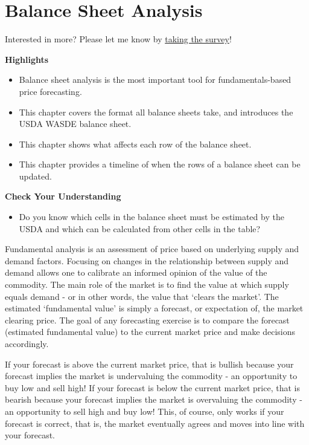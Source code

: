 \documentclass[
  letterpaper,
  DIV=11,
  numbers=noendperiod]{scrreprt}
\providecommand{\tightlist}{%
  \setlength{\itemsep}{0pt}\setlength{\parskip}{0pt}}\usepackage{longtable,booktabs,array}
\begin{document}
\chapter{Balance Sheet Analysis}\label{balance-sheet-analysis}

{Interested in more? Please let me know by}
\href{https://forms.gle/Q3VByCQZHjfQSy9D7}{taking the survey}!

\textbf{Highlights}

\begin{itemize}
\tightlist
\item
  Balance sheet analysis is the most important tool for
  fundamentals-based price forecasting.
\item
  This chapter covers the format all balance sheets take, and introduces
  the USDA WASDE balance sheet.
\item
  This chapter shows what affects each row of the balance sheet.
\item
  This chapter provides a timeline of when the rows of a balance sheet
  can be updated.
\end{itemize}

\textbf{Check Your Understanding}

\begin{itemize}
\tightlist
\item
  Do you know which cells in the balance sheet must be estimated by the
  USDA and which can be calculated from other cells in the table?
\end{itemize}

Fundamental analysis is an assessment of price based on underlying
supply and demand factors. Focusing on changes in the relationship
between supply and demand allows one to calibrate an informed opinion of
the value of the commodity. The main role of the market is to find the
value at which supply equals demand - or in other words, the value that
`clears the market'. The estimated `fundamental value' is simply a
forecast, or expectation of, the market clearing price. The goal of any
forecasting exercise is to compare the forecast (estimated fundamental
value) to the current market price and make decisions accordingly.

If your forecast is above the current market price, that is bullish
because your forecast implies the market is undervaluing the commodity -
an opportunity to buy low and sell high! If your forecast is below the
current market price, that is bearish because your forecast implies the
market is overvaluing the commodity - an opportunity to sell high and
buy low! This, of course, only works if your forecast is correct, that
is, the market eventually agrees and moves into line with your forecast.
\end{document}
